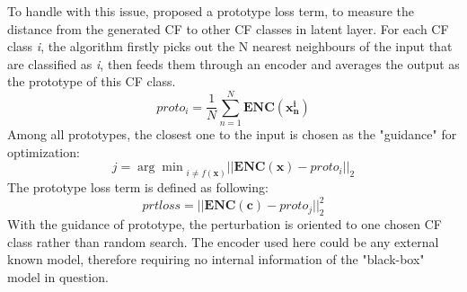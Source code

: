 To handle with this issue, \cite{prototype} proposed a prototype loss term, to measure the distance from the generated CF to other CF classes in latent layer. For each CF class \emph{i}, the algorithm firstly picks out the N nearest neighbours of the input that are classified as \emph{i}, then feeds them through an encoder and averages the output as the prototype of this CF class.
\begin{equation}\label{eq:prototype}
  proto_i=\frac{1}{N}\sum_{n=1}^{N}\mathbf{ENC}(\mathbf{x_n^i})
\end{equation}
Among all prototypes, the closest one to the input is chosen as the "guidance" for optimization:
\begin{equation}\label{eq:closestProto}
  j = {\arg\min}_{i\neq f(\textbf{x})}||\mathbf{ENC}(\textbf{x})-proto_i||_2
\end{equation}
The prototype loss term is defined as following:
\begin{equation}\label{eq:protoloss}
  prtloss=||\mathbf{ENC}(\textbf{c})-proto_j||_2^2
\end{equation}
With the guidance of prototype, the perturbation is oriented to one chosen CF class rather than random search. The encoder used here could be any external known model, therefore requiring no internal information of the "black-box" model in question.  